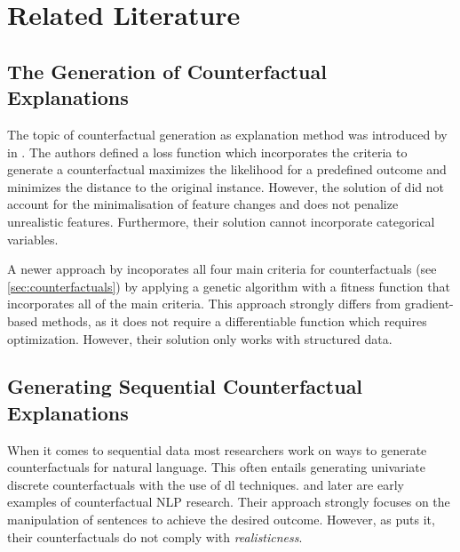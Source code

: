 \documentclass[12pt,a4paper]{report}
\begin{document}



\section{Related Literature}
\subsection{The Generation of Counterfactual Explanations}
The topic of counterfactual generation as explanation method was introduced by \citeauthor{wachter_CounterfactualExplanationsOpening_2017} in \citeyear{wachter_CounterfactualExplanationsOpening_2017}\needscite. The authors defined a loss function which incorporates the criteria to generate a counterfactual maximizes the likelihood for a predefined outcome and minimizes the distance to the original instance. However, the solution of \citeauthor{wachter_CounterfactualExplanationsOpening_2017} did not account for the minimalisation of feature changes and does not penalize unrealistic features. Furthermore, their solution cannot incorporate categorical variables.

A newer approach by \citeauthor{dandl_MultiObjectiveCounterfactualExplanations_2020} incoporates all four main criteria for counterfactuals (see \autoref{sec:counterfactuals}) by applying a genetic algorithm with a fitness function that incorporates all of the main criteria\needscite. This approach strongly differs from gradient-based methods, as it does not require a differentiable function which requires optimization.
However, their solution only works with structured data.

\subsection{Generating Sequential Counterfactual Explanations}
When it comes to sequential data most researchers work on ways to generate counterfactuals for natural language. This often entails generating univariate discrete counterfactuals with the use of \gls{dl} techniques. \citeauthor{martens_ExplainingDatadrivenDocument_2014} and later \citeauthor{krause_InteractingPredictionsVisual_2016} are early examples of counterfactual NLP research. Their approach strongly focuses on the manipulation of sentences to achieve the desired outcome. However, as \citeauthor{robeer_GeneratingRealisticNatural_2021} puts it, their counterfactuals do not comply with \emph{realisticness}.
\end{document}
